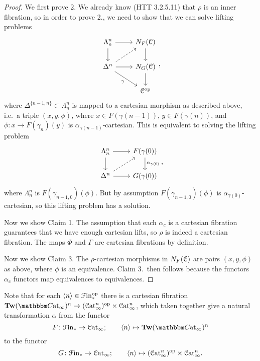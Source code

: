 \documentclass[main.tex]{subfiles}
\begin{document}
\begin{proof}
  We first prove 2. We already know (HTT 3.2.5.11) that $\rho$ is an inner fibration, so in order to prove 2., we need to show that we can solve lifting problems
  \begin{equation*}
    \begin{tikzcd}
      \Lambda^{n}_{n}
      \arrow[r]
      \arrow[d]
      & N_{F}(\category{C})
      \arrow[d]
      \\
      \Delta^{n}
      \arrow[r]
      \arrow[ur, dashed]
      \arrow[dr, swap, "\gamma"]
      & N_{G}(\category{C})
      \arrow[d]
      \\
      & \category{C}\op
    \end{tikzcd},
  \end{equation*}
  where $\Delta^{\{n-1, n\}} \subset \Lambda^{n}_{n}$ is mapped to a cartesian morphism as described above, i.e.\ a triple $(x, y, \phi)$, where $x \in F(\gamma(n-1))$, $y \in F(\gamma(n))$, and $\phi\colon x \to F(\gamma_{n})(y)$ is $\alpha_{\gamma(n-1)}$-cartesian. This is equivalent to solving the lifting problem
  \begin{equation*}
    \begin{tikzcd}
      \Lambda^{n}_{n}
      \arrow[r]
      \arrow[d]
      & F(\gamma(0))
      \arrow[d, "\alpha_{\gamma(0)}"]
      \\
      \Delta^{n}
      \arrow[r]
      \arrow[ur, dashed]
      & G(\gamma(0))
    \end{tikzcd},
  \end{equation*}
  where $\Lambda^{n}_{n}$ is $F(\gamma_{n-1, 0})(\phi)$. But by assumption $F(\gamma_{n-1, 0})(\phi)$ is $\alpha_{\gamma(0)}$-cartesian, so this lifting problem has a solution.

  Now we show Claim 1. The assumption that each $\alpha_{c}$ is a cartesian fibration guarantees that we have enough cartesian lifts, so $\rho$ is indeed a cartesian fibration. The maps $\Phi$ and $\Gamma$ are cartesian fibrations by definition.

  Now we show Claim 3. The $\rho$-cartesian morphisms in $N_{F}(\mathcal{C})$ are pairs $(x, y, \phi)$ as above, where $\phi$ is an equivalence. Claim 3.\ then follows because the functors $\alpha_{c}$ functors map equivalences to equivalences.
\end{proof}


Note that for each $\langle n \rangle \in \mathcal{F}\mathrm{in}_{*}^{\mathrm{op}}$ there is a cartesian fibration $\Tw(\ICCat)^{n} \to (\ICat^{n})\op \times \ICat^{n}$, which taken together give a natural transformation $\alpha$ from the functor
\begin{equation*}
  F\colon \Finp \to \ICat;\qquad \langle n \rangle \mapsto \Tw(\ICCat)^{n}
\end{equation*}
to the functor
\begin{equation*}
  G\colon \mathcal{F}\mathrm{in}_{*} \to \mathcal{C}\mathrm{at}_{\infty};\qquad \langle n \rangle \mapsto ( \mathcal{C}\mathrm{at}_{\infty}^{n} )^{\mathrm{op}} \times \mathcal{C}\mathrm{at}_{\infty}^{n}.
\end{equation*}
\end{document}
